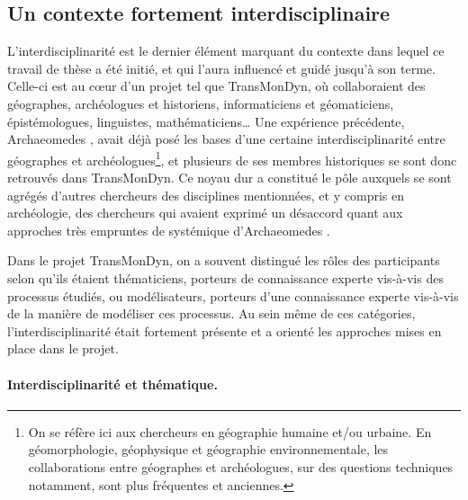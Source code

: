 \subsection{Un contexte fortement interdisciplinaire}

L'interdisciplinarité est le dernier élément marquant du contexte dans lequel ce travail de thèse a été initié, et qui l'aura influencé et guidé jusqu'à son terme.
Celle-ci est au cœur d'un projet tel que TransMonDyn, où collaboraient des géographes, archéologues et historiens, informaticiens et géomaticiens, épistémologues, linguistes, mathématiciens\ldots{}
Une expérience précédente, Archaeomedes \autocite{durand1998archaeomedes}, avait déjà posé les bases d'une certaine interdisciplinarité entre géographes et archéologues\footnote{
	On se réfère ici aux chercheurs en géographie humaine et/ou urbaine.
	En géomorphologie, géophysique et géographie environnementale, les collaborations entre géographes et archéologues, sur des questions techniques notamment, sont plus fréquentes et anciennes.
}, et plusieurs de ses membres historiques se sont donc retrouvés dans TransMonDyn.
Ce \og noyau dur\fg{} a constitué le pôle auxquels se sont agrégés d'autres chercheurs des disciplines mentionnées, et y compris en archéologie, des chercheurs qui avaient exprimé un désaccord quant aux approches très empruntes de systémique d'Archaeomedes \autocite[voir][par exemple]{ferdiere_modelisation_2000}.


Dans le projet TransMonDyn, on a souvent distingué les rôles des participants selon qu'ils étaient \og thématiciens\fg{}, porteurs de connaissance experte vis-à-vis des processus étudiés, ou \og modélisateurs\fg{}, porteurs d'une connaissance experte vis-à-vis de la manière de modéliser ces processus.
Au sein même de ces catégories, l'interdisciplinarité était fortement présente et a orienté les approches mises en place dans le projet.

\paragraph{Interdisciplinarité et thématique.}

